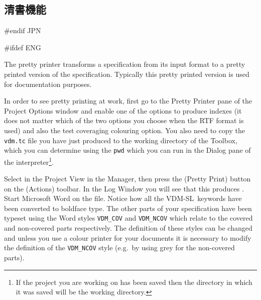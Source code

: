 \documentclass[\pformat,12pt]{article}
\newcommand{\vdmslpp}{VDM-SL}
\newcommand{\Toolbox}{Toolbox}
\newcommand{\vdmslpp}{VDM++}
\newcommand{\Toolbox}{Toolbox}
\newcommand{\guicmd}[1]{{\sf #1}}
\newcommand{\guicmd}[1]{{\gt #1}}
\begin{document}
\subsection{清書機能}\label{subsec:pp}
#endif JPN

#ifdef ENG

The pretty printer transforms a specification from its input format to
a pretty printed version of the specification. Typically this pretty
printed version is used for documentation purposes.

In order to see pretty printing at work, first go to the \guicmd{Pretty
Printer} pane of the \guicmd{Project Options} window and enable one of the
options to produce indexes (it does not matter which of the 
two options you choose when the RTF format is used) and also the test
coveraging colouring option. You also need to copy the {\tt vdm.tc}
file you have just produced to the working directory of the
\Toolbox, which you can determine using the {\tt pwd}
which you can run in the \guicmd{Dialog} pane of the
interpreter\footnote{If the project you are working on has been saved
  then the directory in which it was saved will be the working
  directory.}.

Select  in the \guicmd{Project View} in the
\guicmd{Manager}, then press the %
(\guicmd{Pretty Print}) button on the
(\guicmd{Actions}) toolbar. In the \guicmd{Log Window} you will
see that this produces . Start Microsoft Word on the
file. Notice how all the \vdmslpp\ keywords have been converted to
boldface type. The
other parts of your specification have been typeset using the Word
styles {\tt VDM\_COV} and {\tt VDM\_NCOV} which relate to the covered
and non-covered parts respectively. The definition of these styles can
be changed and unless you use a colour printer for your documents it
is necessary to modify the definition of the {\tt VDM\_NCOV} style
(e.g.\ by using grey for the non-covered parts).
\end{document}
